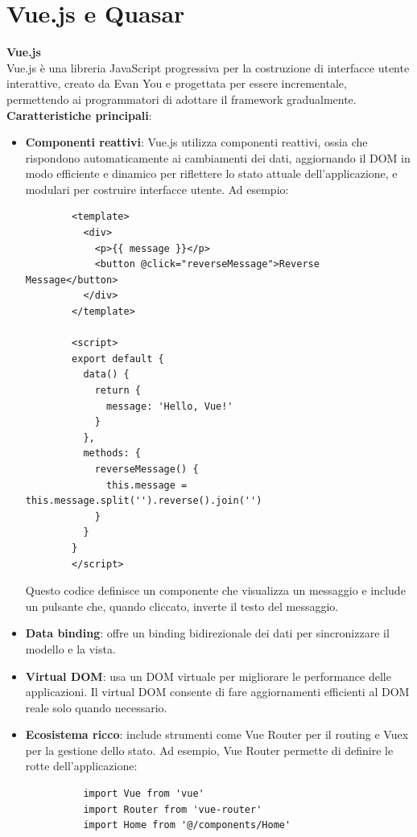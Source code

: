 \documentclass[a4paper, 12pt]{book}
\begin{document}
\section{Vue.js e Quasar}

 {\Large\textbf{Vue.js}}\\

Vue.js \cite{Vue.js} è una libreria JavaScript progressiva per la costruzione di interfacce utente interattive, creato da Evan You e progettata
per essere incrementale, permettendo ai programmatori di adottare il framework gradualmente.\\

\textbf{Caratteristiche principali}:

\begin{itemize}
  \item \textbf{Componenti reattivi}: Vue.js utilizza componenti reattivi, ossia che rispondono automaticamente ai cambiamenti
        dei dati, aggiornando il DOM in modo efficiente e dinamico per riflettere lo stato attuale dell'applicazione, e modulari
        per costruire interfacce utente. Ad esempio:
        \begin{lstlisting}
        <template>
          <div>
            <p>{{ message }}</p>
            <button @click="reverseMessage">Reverse Message</button>
          </div>
        </template>

        <script>
        export default {
          data() {
            return {
              message: 'Hello, Vue!'
            }
          },
          methods: {
            reverseMessage() {
              this.message = this.message.split('').reverse().join('')
            }
          }
        }
        </script>
      \end{lstlisting}
        Questo codice definisce un componente che visualizza un messaggio e include un pulsante che, quando
        cliccato, inverte il testo del messaggio.
  \item \textbf{Data binding}: offre un binding bidirezionale dei dati per sincronizzare il modello e la vista.
  \item \textbf{Virtual DOM}: usa un DOM virtuale per migliorare le performance delle applicazioni. Il virtual DOM consente di fare aggiornamenti
        efficienti al DOM reale solo quando necessario.
  \item \textbf{Ecosistema ricco}: include strumenti come Vue Router per il routing e Vuex per la gestione dello stato. Ad esempio, Vue Router
        permette di definire le rotte dell'applicazione:\\
        \begin{lstlisting}
          import Vue from 'vue'
          import Router from 'vue-router'
          import Home from '@/components/Home'


\end{lstlisting}
\end{itemize}
\end{document}
